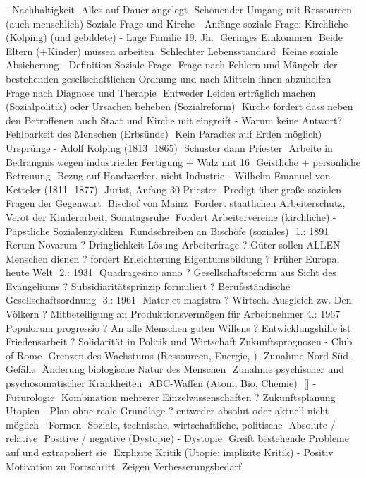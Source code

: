 \documentclass[11pt, paper=a4, twocolumn]{scrartcl}
\begin{document}
-	Nachhaltigkeit
	Alles auf Dauer angelegt
	Schonender Umgang mit Ressourcen (auch menschlich)
Soziale Frage und Kirche
-	Anfänge soziale Frage: Kirchliche (Kolping) (und gebildete)
-	Lage Familie 19. Jh.
	Geringes Einkommen
	Beide Eltern (+Kinder) müssen arbeiten
	Schlechter Lebensstandard
	Keine soziale Absicherung
-	Definition Soziale Frage
	Frage nach Fehlern und Mängeln der bestehenden gesellschaftlichen Ordnung und nach Mitteln ihnen abzuhelfen
	Frage nach Diagnose und Therapie
	Entweder Leiden erträglich machen (Sozialpolitik) oder Ursachen beheben (Sozialreform)
	Kirche fordert dass neben den Betroffenen auch Staat und Kirche mit eingreift
-	Warum keine Antwort?
	Fehlbarkeit des Menschen (Erbsünde)
	Kein Paradies auf Erden möglich)
Ursprünge
-	Adolf Kolping (1813  1865)
	Schuster dann Priester
	Arbeite in Bedrängnis wegen industrieller Fertigung + Walz mit 16
	Geistliche + persönliche Betreuung
	Bezug auf Handwerker, nicht Industrie
-	Wilhelm Emanuel von Ketteler (1811  1877)
	Jurist, Anfang 30 Priester
	Predigt über große sozialen Fragen der Gegenwart
	Bischof von Mainz
	Fordert staatlichen Arbeiterschutz, Verot der Kinderarbeit, Sonntagsruhe
	Fördert Arbeitervereine (kirchliche)
-	Päpstliche Sozialenzykliken
	Rundschreiben an Bischöfe (soziales)
	1.: 1891  Rerum Novarum
?	Dringlichkeit Lösung Arbeiterfrage
?	Güter sollen ALLEN Menschen dienen
? fordert Erleichterung Eigentumsbildung
?	Früher Europa, heute Welt
	2.: 1931  Quadragesino anno
?	Gesellschaftsreform aus Sicht des Evangeliums
?	Subsidiaritätsprinzip formuliert
?	Berufsständische Gesellschaftsordnung
	3.: 1961  Mater et magistra
?	Wirtsch. Ausgleich zw. Den Völkern
?	Mitbeteiligung an Produktionsvermögen für Arbeitnehmer
	4.: 1967  Populorum progressio
?	An alle Menschen guten Willens
?	Entwicklungshilfe ist Friedensarbeit
?	Solidarität in Politik und Wirtschaft
Zukunftsprognosen
-	Club of Rome
	Grenzen des Wachstums (Ressourcen, Energie, )
	Zunahme Nord-Süd-Gefälle
	Änderung biologische Natur des Menschen
	Zunahme psychischer und psychosomatischer Krankheiten
	ABC-Waffen (Atom, Bio, Chemie)
	[]
-	Futurologie
	Kombination mehrerer Einzelwissenschaften
? Zukunftsplanung
Utopien
-	Plan ohne reale Grundlage
? entweder absolut oder aktuell nicht möglich
-	Formen
	Soziale, technische, wirtschaftliche, politische
	Absolute / relative
	Positive / negative (Dystopie)
-	Dystopie
	Greift bestehende Probleme auf und extrapoliert sie
	Explizite Kritik (Utopie: implizite Kritik)
-	Positiv
	Motivation zu Fortschritt
	Zeigen Verbesserungsbedarf
\end{document}
